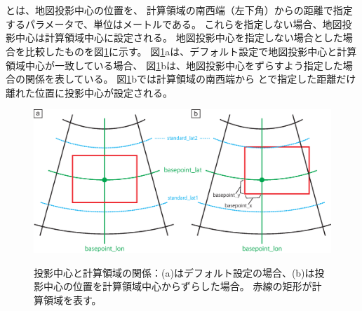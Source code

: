 {\small {\gt
{}}}\\~\\

\noindent
{}とは、地図投影中心の位置を、
計算領域の南西端（左下角）からの距離で指定するパラメータで、単位はメートルである。
これらを指定しない場合、地図投影中心は計算領域中心に設定される。
地図投影中心を指定しない場合とした場合を比較したものを図\ref{fig:map_lc}に示す。
図\ref{fig:map_lc}aは、デフォルト設定で地図投影中心と計算領域中心が一致している場合、
図\ref{fig:map_lc}bは、地図投影中心をずらすよう指定した場合の関係を表している。
図\ref{fig:map_lc}bでは計算領域の南西端から
とで指定した距離だけ離れた位置に投影中心が設定される。

\begin{figure}[t]
\begin{center}
  \includegraphics[width=0.8\hsize]{./figure/LC_latlon_xy.eps}\\
  \caption{投影中心と計算領域の関係：(a)はデフォルト設定の場合、(b)は投影中心の位置を計算領域中心からずらした場合。
  赤線の矩形が計算領域を表す。}
  \label{fig:map_lc}
\end{center}
\end{figure}

